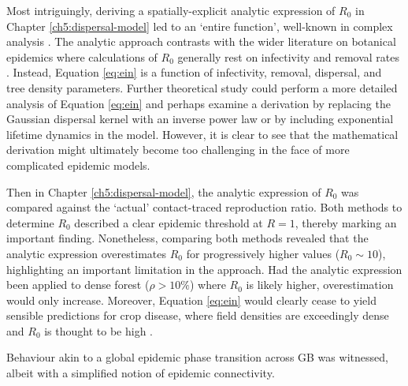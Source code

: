 Most intriguingly, deriving a spatially-explicit analytic expression of $R_0$ in Chapter \ref{ch5:dispersal-model} led to an `entire function', well-known in complex analysis \cite{abramowitz1948handbook}. 
The analytic approach contrasts with the wider literature on botanical epidemics where calculations of $R_0$ generally rest on infectivity and removal rates \cite{...}.
Instead, Equation \ref{eq:ein} is a function of infectivity, removal, dispersal, and tree density parameters.
Further theoretical study could perform a more detailed analysis of Equation \ref{eq:ein} and perhaps examine a derivation by replacing the Gaussian dispersal kernel with an inverse power law or by including exponential lifetime dynamics in the model. 
However, it is clear to see that the mathematical derivation might ultimately become too challenging in the face of more complicated epidemic models. 

Then in Chapter \ref{ch5:dispersal-model}, the analytic expression of $R_0$ was compared against the `actual' contact-traced reproduction ratio. 
Both methods to determine $R_0$ described a clear epidemic threshold at $R=1$, thereby marking an important finding.
Nonetheless, comparing both methods revealed that the analytic expression overestimates $R_0$ for progressively higher values ($R_0 \sim 10$),
highlighting an important limitation in the approach. Had the analytic expression been applied to dense forest ($\rho >10\%$) where $R_0$ is likely higher, overestimation would only increase.
Moreover, Equation \ref{eq:ein} would clearly cease to yield sensible predictions for crop disease, where field densities are exceedingly dense and $R_0$ is thought to be high \cite{...}. 



Behaviour akin to a global epidemic phase transition across GB was witnessed, albeit with a simplified notion of epidemic connectivity.



